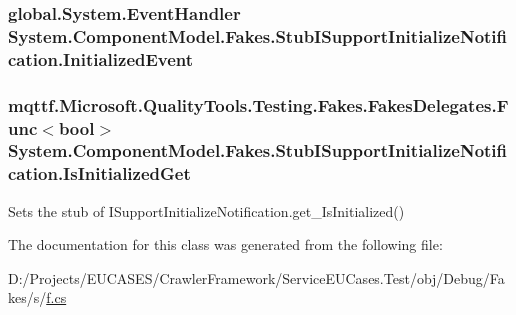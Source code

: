 \hypertarget{class_system_1_1_component_model_1_1_fakes_1_1_stub_i_support_initialize_notification_a47804cf8f1cd4efe7f857989cd205efa}{
\subsubsection[{Initialized\-Event}]{\setlength{\rightskip}{0pt plus 5cm}global.\-System.\-Event\-Handler System.\-Component\-Model.\-Fakes.\-Stub\-I\-Support\-Initialize\-Notification.\-Initialized\-Event}}\label{class_system_1_1_component_model_1_1_fakes_1_1_stub_i_support_initialize_notification_a47804cf8f1cd4efe7f857989cd205efa}
\hypertarget{class_system_1_1_component_model_1_1_fakes_1_1_stub_i_support_initialize_notification_a9c210333b205866faa7f11c657ec4203}{
\subsubsection[{Is\-Initialized\-Get}]{\setlength{\rightskip}{0pt plus 5cm}mqttf.\-Microsoft.\-Quality\-Tools.\-Testing.\-Fakes.\-Fakes\-Delegates.\-Func$<$bool$>$ System.\-Component\-Model.\-Fakes.\-Stub\-I\-Support\-Initialize\-Notification.\-Is\-Initialized\-Get}}\label{class_system_1_1_component_model_1_1_fakes_1_1_stub_i_support_initialize_notification_a9c210333b205866faa7f11c657ec4203}


Sets the stub of I\-Support\-Initialize\-Notification.\-get\-\_\-\-Is\-Initialized()



The documentation for this class was generated from the following file\-:\begin{DoxyCompactItemize}
\item 
D\-:/\-Projects/\-E\-U\-C\-A\-S\-E\-S/\-Crawler\-Framework/\-Service\-E\-U\-Cases.\-Test/obj/\-Debug/\-Fakes/s/\hyperlink{s_2f_8cs}{f.\-cs}\end{DoxyCompactItemize}
